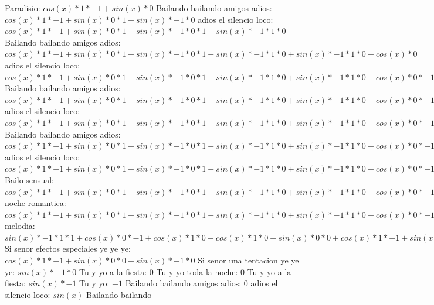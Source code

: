 \documentclass{article}
\begin{document}
Paradisio: $cos(x)*1*-1+sin(x)*0$ Bailando bailando amigos adios: ${cos(x)*1*-1+sin(x)*0}*1+sin(x)*-1*0$ adios el silencio loco: ${{cos(x)*1*-1+sin(x)*0}*1+sin(x)*-1*0}*1+sin(x)*-1*1*0$ Bailando bailando amigos adios: ${{cos(x)*1*-1+sin(x)*0}*1+sin(x)*-1*0}*1+sin(x)*-1*1*0+sin(x)*-1*1*0+cos(x)*0$ adios el silencio loco: ${{{cos(x)*1*-1+sin(x)*0}*1+sin(x)*-1*0}*1+sin(x)*-1*1*0+sin(x)*-1*1*0+cos(x)*0}*-1+{sin(x)*-1*1*1+cos(x)*0}*0$ Bailando bailando amigos adios: ${{{cos(x)*1*-1+sin(x)*0}*1+sin(x)*-1*0}*1+sin(x)*-1*1*0+sin(x)*-1*1*0+cos(x)*0}*-1+{sin(x)*-1*1*1+cos(x)*0}*0+{sin(x)*-1*1*1+cos(x)*0}*0+cos(x)*1*0$ adios el silencio loco: ${{{cos(x)*1*-1+sin(x)*0}*1+sin(x)*-1*0}*1+sin(x)*-1*1*0+sin(x)*-1*1*0+cos(x)*0}*-1+{sin(x)*-1*1*1+cos(x)*0}*0+{sin(x)*-1*1*1+cos(x)*0}*0+cos(x)*1*0+{sin(x)*-1*1*1+cos(x)*0}*0+cos(x)*1*0+cos(x)*1*0+sin(x)*0$ Bailando bailando amigos adios: ${{{{cos(x)*1*-1+sin(x)*0}*1+sin(x)*-1*0}*1+sin(x)*-1*1*0+sin(x)*-1*1*0+cos(x)*0}*-1+{sin(x)*-1*1*1+cos(x)*0}*0+{sin(x)*-1*1*1+cos(x)*0}*0+cos(x)*1*0+{sin(x)*-1*1*1+cos(x)*0}*0+cos(x)*1*0+cos(x)*1*0+sin(x)*0}*1+{{sin(x)*-1*1*1+cos(x)*0}*-1+cos(x)*1*0+cos(x)*1*0+sin(x)*0}*0$ adios el silencio loco: ${{{{cos(x)*1*-1+sin(x)*0}*1+sin(x)*-1*0}*1+sin(x)*-1*1*0+sin(x)*-1*1*0+cos(x)*0}*-1+{sin(x)*-1*1*1+cos(x)*0}*0+{sin(x)*-1*1*1+cos(x)*0}*0+cos(x)*1*0+{sin(x)*-1*1*1+cos(x)*0}*0+cos(x)*1*0+cos(x)*1*0+sin(x)*0}*1+{{sin(x)*-1*1*1+cos(x)*0}*-1+cos(x)*1*0+cos(x)*1*0+sin(x)*0}*0+{{sin(x)*-1*1*1+cos(x)*0}*-1+cos(x)*1*0+cos(x)*1*0+sin(x)*0}*0+{cos(x)*1*-1+sin(x)*0}*0$ Bailo sensual: ${{{{cos(x)*1*-1+sin(x)*0}*1+sin(x)*-1*0}*1+sin(x)*-1*1*0+sin(x)*-1*1*0+cos(x)*0}*-1+{sin(x)*-1*1*1+cos(x)*0}*0+{sin(x)*-1*1*1+cos(x)*0}*0+cos(x)*1*0+{sin(x)*-1*1*1+cos(x)*0}*0+cos(x)*1*0+cos(x)*1*0+sin(x)*0}*1+{{sin(x)*-1*1*1+cos(x)*0}*-1+cos(x)*1*0+cos(x)*1*0+sin(x)*0}*0+{{sin(x)*-1*1*1+cos(x)*0}*-1+cos(x)*1*0+cos(x)*1*0+sin(x)*0}*0+{cos(x)*1*-1+sin(x)*0}*0+{{sin(x)*-1*1*1+cos(x)*0}*-1+cos(x)*1*0+cos(x)*1*0+sin(x)*0}*0+{cos(x)*1*-1+sin(x)*0}*0+{cos(x)*1*-1+sin(x)*0}*0+sin(x)*-1*0$ noche romantica: ${{{{cos(x)*1*-1+sin(x)*0}*1+sin(x)*-1*0}*1+sin(x)*-1*1*0+sin(x)*-1*1*0+cos(x)*0}*-1+{sin(x)*-1*1*1+cos(x)*0}*0+{sin(x)*-1*1*1+cos(x)*0}*0+cos(x)*1*0+{sin(x)*-1*1*1+cos(x)*0}*0+cos(x)*1*0+cos(x)*1*0+sin(x)*0}*1+{{sin(x)*-1*1*1+cos(x)*0}*-1+cos(x)*1*0+cos(x)*1*0+sin(x)*0}*0+{{sin(x)*-1*1*1+cos(x)*0}*-1+cos(x)*1*0+cos(x)*1*0+sin(x)*0}*0+{cos(x)*1*-1+sin(x)*0}*0+{{sin(x)*-1*1*1+cos(x)*0}*-1+cos(x)*1*0+cos(x)*1*0+sin(x)*0}*0+{cos(x)*1*-1+sin(x)*0}*0+{cos(x)*1*-1+sin(x)*0}*0+sin(x)*-1*0$  \newline melodia: ${{sin(x)*-1*1*1+cos(x)*0}*-1+cos(x)*1*0+cos(x)*1*0+sin(x)*0}*0+{cos(x)*1*-1+sin(x)*0}*0+{cos(x)*1*-1+sin(x)*0}*0+sin(x)*-1*0$  \newline Si senor efectos especiales ye ye ye: ${cos(x)*1*-1+sin(x)*0}*0+sin(x)*-1*0$  \newline Si senor una tentacion ye ye ye: $sin(x)*-1*0$ Tu y yo a la fiesta: $0$ Tu y yo toda la noche: $0$  \newline Tu y yo a la fiesta: $sin(x)*-1$ Tu y yo: $-1$ Bailando bailando amigos adios: $0$  \newline adios el silencio loco: $sin(x)$  \newline Bailando bailando 
\end{document}
